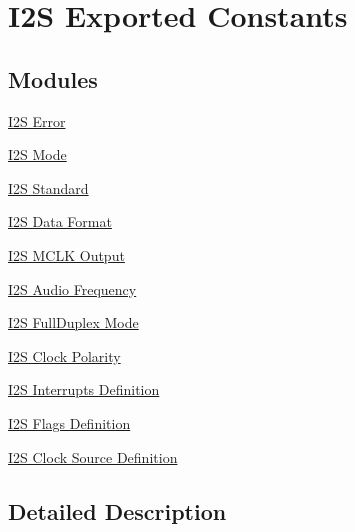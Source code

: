 \hypertarget{group___i2_s___exported___constants}{}\section{I2S Exported Constants}
\label{group___i2_s___exported___constants}
\subsection*{Modules}
\begin{DoxyCompactItemize}
\item 
\hyperlink{group___i2_s___error}{I2\+S Error}
\item 
\hyperlink{group___i2_s___mode}{I2\+S Mode}
\item 
\hyperlink{group___i2_s___standard}{I2\+S Standard}
\item 
\hyperlink{group___i2_s___data___format}{I2\+S Data Format}
\item 
\hyperlink{group___i2_s___m_c_l_k___output}{I2\+S M\+C\+L\+K Output}
\item 
\hyperlink{group___i2_s___audio___frequency}{I2\+S Audio Frequency}
\item 
\hyperlink{group___i2_s___full_duplex___mode}{I2\+S Full\+Duplex Mode}
\item 
\hyperlink{group___i2_s___clock___polarity}{I2\+S Clock Polarity}
\item 
\hyperlink{group___i2_s___interrupts___definition}{I2\+S Interrupts Definition}
\item 
\hyperlink{group___i2_s___flags___definition}{I2\+S Flags Definition}
\item 
\hyperlink{group___i2_s___clock___source}{I2\+S Clock Source Definition}
\end{DoxyCompactItemize}


\subsection{Detailed Description}
